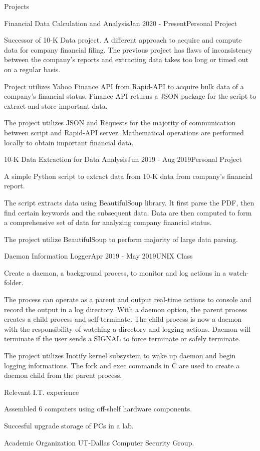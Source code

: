 \documentclass{resume} %
\begin{document}
\begin{rSection}{Projects}
    \begin{rSubsection}{Financial Data Calculation and Analysis}{Jan 2020 - Present}{Personal Project}{}
        \item Successor of 10-K Data project. A different approach to acquire and compute data for company financial filing. The previous project has flaws of inconsistency between the company's reports and extracting data takes too long or timed out on a regular basis.
        \item Project utilizes Yahoo Finance API from Rapid-API to acquire bulk data of a company's financial status. Finance API returns a JSON package for the script to extract and store important data.
        \item The project utilizes JSON and Requests for the majority of communication between script and Rapid-API server. Mathematical operations are performed locally to obtain important financial data.
    \end{rSubsection}
    
    \begin{rSubsection}{10-K Data Extraction for Data Analysis}{Jun 2019 - Aug 2019}{Personal Project}{}
        \item A simple Python script to extract data from 10-K data from company's financial report.
        \item The script extracts data using BeautifulSoup library. It first parse the PDF, then find certain keywords and the subsequent data. Data are then computed to form a comprehensive set of data for analyzing company financial status.
        \item The project utilize BeautifulSoup to perform majority of large data parsing.
    \end{rSubsection}
    
    \begin{rSubsection}{Daemon Information Logger}{Apr 2019 - May 2019}{UNIX Class}{}
        \item Create a daemon, a background process, to monitor and log actions in a watch-folder.
        \item The process can operate as a parent and output real-time actions to console and record the output in a log directory. With a daemon option, the parent process creates a child process and self-terminate. The child process is now a daemon with the responsibility of watching a directory and logging actions. Daemon will terminate if the user sends a SIGNAL to force terminate or safely terminate. 
        \item The project utilizes Inotify kernel subsystem to wake up daemon and begin logging informations. The fork and exec commands in C are used to create a daemon child from the parent process.
    \end{rSubsection}
\end{rSection}

\begin{rSection}{Relevant I.T. experience}
    \item Assembled 6 computers using off-shelf hardware components.
    \item Succesful upgrade storage of PCs in a lab.
\end{rSection}

\begin{rSection}{Academic Organization} 
    UT-Dallas Computer Security Group.
\end{rSection}
\end{document}
